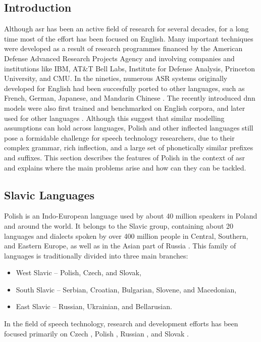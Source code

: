 \subsection{Introduction}
Although \gls{asr} has been an active field of research for several decades, for a long time most of the effort has been focused on English.  Many important techniques were developed as a result of research programmes financed by the American Defense Advanced Research Projects Agency and involving companies and institutions like IBM, AT\&T Bell Labs, Institute for Defense Analysis, Princeton University, and CMU. In the nineties, numerous ASR systems originally developed for English had been succesfully ported to other languages, such as French, German, Japanese, and Mandarin Chinese \cite{besacier2014automatic}. The recently introduced \gls{dnn} models were also first trained and benchmarked on English corpora, and later used for other languages \cite{hinton2012deep}. Although this suggest that similar modelling assumptions can hold across languages, Polish and other inflected languages still pose a formidable challenge for speech technology researchers, due to their complex grammar, rich inflection, and a large set of phonetically similar prefixes and suffixes. This section describes the features of Polish in the context of \gls{asr} and explains where the main problems arise and how can they can be tackled.
\subsection{Slavic Languages}
Polish is an Indo-European language used by about 40 million speakers in Poland and around the world. It belongs to the Slavic group, containing about 20 languages and dialects spoken by over 400 million people in Central, Southern, and Eastern Europe, as well as in the Asian part of Russia \cite{karpov2012speech}. This family of languages is traditionally divided into three main branches:
\begin{itemize}
\item West Slavic -- Polish, Czech, and Slovak,
\item South Slavic -- Serbian, Croatian, Bulgarian, Slovene, and Macedonian,
\item East Slavic -- Russian, Ukrainian, and Bellarusian.
\end{itemize}
In the field of speech technology, research and development efforts has been focused primarily on Czech \cite{nouza2010adapting, oparin2008morphological}, Polish \cite{zelasko2015linguistically, ziolko2011automatic}, Russian {\cite{karpov2012speech}}, and Slovak \cite{lojka2009finite}.
